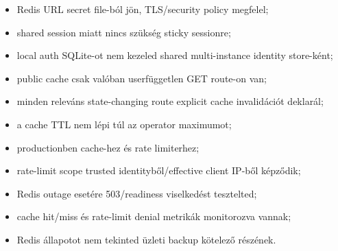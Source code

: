 \begin{itemize}
  \item Redis URL secret file-ból jön, TLS/security policy megfelel;
  \item shared session miatt nincs szükség sticky sessionre;
  \item local auth SQLite-ot nem kezeled shared multi-instance identity store-ként;
  \item public cache csak valóban userfüggetlen GET route-on van;
  \item minden releváns state-changing route explicit cache invalidációt deklarál;
  \item a cache TTL nem lépi túl az operator maximumot;
  \item productionben  cache-hez és rate limiterhez;
  \item rate-limit scope trusted identityből/effective client IP-ből képződik;
  \item Redis outage esetére 503/readiness viselkedést tesztelted;
  \item cache hit/miss és rate-limit denial metrikák monitorozva vannak;
  \item Redis állapotot nem tekinted üzleti backup kötelező részének.
\end{itemize}
